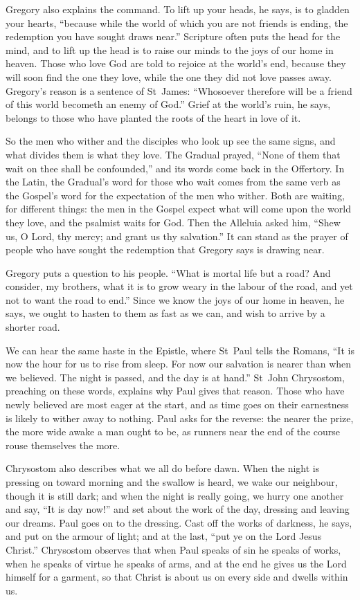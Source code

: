 Gregory also explains the command. To lift up your heads, he says, is to
gladden your hearts, ``because while the world of which you are not friends is
ending, the redemption you have sought draws near.'' Scripture often puts the
head for the mind, and to lift up the head is to raise our minds to the joys
of our home in heaven. Those who love God are told to rejoice at the world's
end, because they will soon find the one they love, while the one they did not
love passes away. Gregory's reason is a sentence of St~James: ``Whosoever
therefore will be a friend of this world becometh an enemy of God.'' Grief at
the world's ruin, he says, belongs to those who have planted the roots of the
heart in love of it.

So the men who wither and the disciples who look up see the same signs, and
what divides them is what they love. The Gradual prayed, ``None of them that
wait on thee shall be confounded,'' and its words come back in the
Offertory. In the Latin, the Gradual's word for those who wait comes from the
same verb as the Gospel's word for the expectation of the men who wither. Both
are waiting, for different things: the men in the Gospel expect what will
come upon the world they love, and the psalmist waits for God. Then the
Alleluia asked him, ``Shew us, O Lord, thy mercy; and grant us thy salvation.''
It can stand as the prayer of people who have sought the redemption that
Gregory says is drawing near.

Gregory puts a question to his people. ``What is mortal life but a road? And
consider, my brothers, what it is to grow weary in the labour of the road, and
yet not to want the road to end.'' Since we know the joys of our home in
heaven, he says, we ought to hasten to them as fast as we can, and wish to
arrive by a shorter road.

We can hear the same haste in the Epistle, where St~Paul tells the Romans,
``It is now the hour for us to rise from sleep. For now our salvation is
nearer than when we believed. The night is passed, and the day is at hand.''
St~John Chrysostom, preaching on these words, explains why Paul gives that
reason. Those who have newly believed are most eager at the start, and as time
goes on their earnestness is likely to wither away to nothing. Paul asks for
the reverse: the nearer the prize, the more wide awake a man ought to be, as
runners near the end of the course rouse themselves the more.

Chrysostom also describes what we all do before dawn. When the night is
pressing on toward morning and the swallow is heard, we wake our neighbour,
though it is still dark; and when the night is really going, we hurry one
another and say, ``It is day now!'' and set about the work of the day,
dressing and leaving our dreams. Paul goes on to the dressing. Cast off the
works of darkness, he says, and put on the armour of light; and at the last,
``put ye on the Lord Jesus Christ.'' Chrysostom observes that when Paul
speaks of sin he speaks of works, when he speaks of virtue he speaks of arms,
and at the end he gives us the Lord himself for a garment, so that Christ is
about us on every side and dwells within us.

